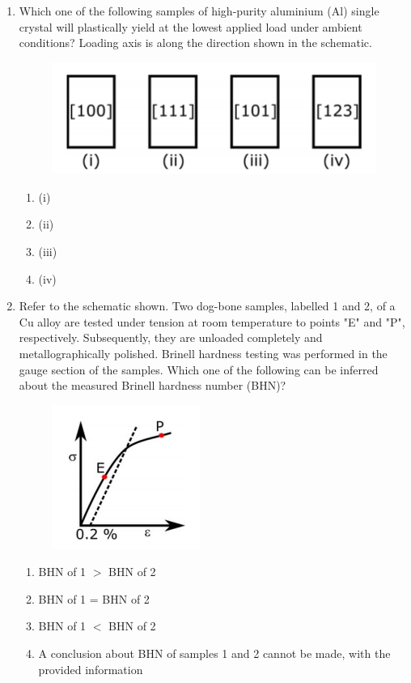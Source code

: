\documentclass[a4paper,10pt]{article}
\begin{document}
\begin{enumerate}
\item Which one of the following samples of high-purity aluminium (Al) single crystal will plastically yield at the lowest applied load under ambient conditions? Loading axis is along the direction shown in the schematic.
\begin{figure}[H]
    \centering
    \includegraphics[width=0.7\columnwidth]{q55.png}
    \caption*{}
    \label{fig:q55}
\end{figure}

\hfill{}
\begin{enumerate}
    \item (i)
    \item (ii)
    \item (iii)
    \item (iv)
\end{enumerate}

\item Refer to the schematic shown. Two dog-bone samples, labelled 1 and 2, of a Cu alloy are tested under tension at room temperature to points "E" and "P", respectively. Subsequently, they are unloaded completely and metallographically polished. Brinell hardness testing was performed in the gauge section of the samples. Which one of the following can be inferred about the measured Brinell hardness number (BHN)?
\begin{figure}[H]
    \centering
    \includegraphics[width=0.4\columnwidth]{q56.png}
    \caption*{}
    \label{fig:q56}
\end{figure}

\hfill{}
\begin{enumerate}
    \item BHN of 1 $>$ BHN of 2
    \item BHN of 1 = BHN of 2
    \item BHN of 1 $<$ BHN of 2
    \item A conclusion about BHN of samples 1 and 2 cannot be made, with the provided information
\end{enumerate}


\end{enumerate}
\end{document}
